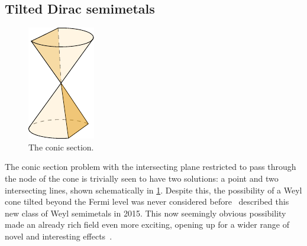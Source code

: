 \clearpage
\subsection{Tilted Dirac semimetals}
\label{sec:typeii}
\begin{figure}
  \centering
  \vspace{-2.6em}
  \includegraphics[width=.25\textwidth]{figures/conicSection}
  \setcapindent*{0pt}
  \caption{The conic section. \label{fig:conic-section-sketch}}
\end{figure}
The conic section problem with the intersecting plane restricted to pass through the node of the cone is trivially seen to have two solutions: a point and two intersecting lines, shown schematically in \cref{fig:conic-section-sketch}.
Despite this, the possibility of a Weyl cone tilted beyond the Fermi level was never considered before~\textcite{soluyanovTypeIIWeylSemimetals2015} described this new class of Weyl semimetals in 2015.
This now seemingly obvious possibility made an already rich field even more exciting, opening up for a wider range of novel and interesting effects~\cite{soluyanovTypeIIWeylSemimetals2015,sharmaChiralAnomalyLongitudinal2017,yuPredictedUnusualMagnetoresponse2016,tchoumakovMagneticFieldInducedRelativisticProperties2016,ferreirosAnomalousNernstThermal2017}.


